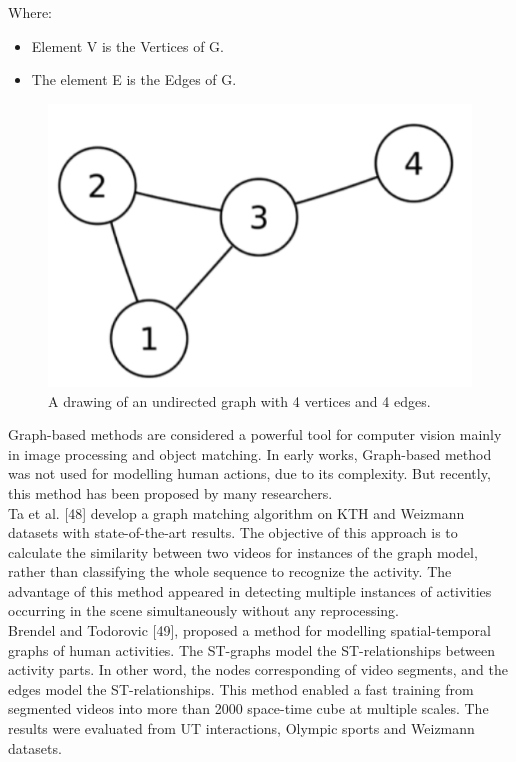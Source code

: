 Where:
\begin{itemize}
\item Element V is the Vertices of G.
\item The element E is the Edges of G.  
\end{itemize}

\begin{figure}[ht]
\centering
\includegraphics{Figures/grr}
\decoRule
\caption[A drawing of an undirected graph with 4 vertices and 4 edges.]{A drawing of an undirected graph with 4 vertices and 4 edges.}
\label{fig:la}
\end{figure}
Graph-based methods are considered a powerful tool for computer vision mainly in image processing and object matching. In early works, Graph-based method was not used for modelling human actions, due to its complexity. But recently, this method has been proposed by many researchers. \\

Ta et al. [48] develop a graph matching algorithm on KTH and Weizmann datasets with state-of-the-art results. The objective of this approach is to calculate the similarity between two videos for instances of the graph model, rather than classifying the whole sequence to recognize the activity. The advantage of this method appeared in detecting multiple instances of activities occurring in the scene simultaneously without any reprocessing. \\

Brendel and Todorovic [49], proposed a method for modelling spatial-temporal graphs of human activities. The ST-graphs model the ST-relationships between activity parts. In other word, the nodes corresponding of video segments, and the edges model the ST-relationships. This method enabled a fast training from segmented videos into more than 2000 space-time cube at multiple scales. The results were evaluated from UT interactions, Olympic sports and Weizmann datasets. \\

